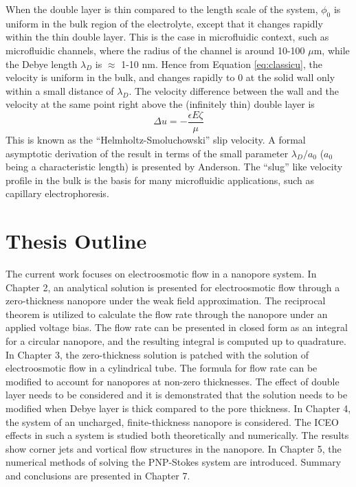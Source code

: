 When the double layer is thin compared to the length scale of the system, $\phi_0$ is uniform in the bulk region of the electrolyte, except that it changes rapidly within the thin double layer. This is the case in microfluidic context, such as microfluidic channels, where the radius of the channel is around 10-100 $\mu$m, while the Debye length $\lambda_D$ is $\approx$ 1-10 nm. Hence from Equation \ref{eq:classicu}, the velocity is uniform in the bulk, and changes rapidly to 0 at the solid wall only within a small distance of $\lambda_D$. The velocity difference between the wall and the velocity at the same point right above the (infinitely thin) double layer is
\begin{equation}
\Delta u = -\frac{\epsilon E \zeta}{\mu}
\label{eq:HSslip}
\end{equation}
This is known as the ``Helmholtz-Smoluchowski'' slip velocity\cite{Helmholtz,Smoluchowski1924}. A formal asymptotic derivation of the result in terms of the small parameter $\lambda_D/a_0$ ($a_0$ being a characteristic length) is presented by Anderson\cite{anderson1985effect}. The ``slug'' like velocity profile in the bulk is the basis for many microfluidic applications, such as capillary electrophoresis\cite{ghosal2006electrokinetic}.

\section{Thesis Outline}
The current work focuses on electroosmotic flow in a nanopore system. In Chapter 2, an analytical solution is presented for electroosmotic flow through a zero-thickness nanopore under the weak field approximation. The reciprocal theorem is utilized to calculate the flow rate through the nanopore under an applied voltage bias. The flow rate can be presented in closed form as an integral for a circular nanopore, and the resulting integral is computed up to quadrature. In Chapter 3, the zero-thickness solution is patched with the solution of electroosmotic flow in a cylindrical tube. The formula for flow rate can be modified to account for nanopores at non-zero thicknesses. The effect of double layer needs to be considered and it is demonstrated that the solution needs to be modified when Debye layer is thick compared to the pore thickness. In Chapter 4, the system of an uncharged, finite-thickness nanopore is considered. The ICEO effects in such a system is studied both theoretically and numerically. The results show corner jets and vortical flow structures in the nanopore. In Chapter 5, the numerical methods of solving the PNP-Stokes system are introduced. Summary and conclusions are presented in Chapter 7. 